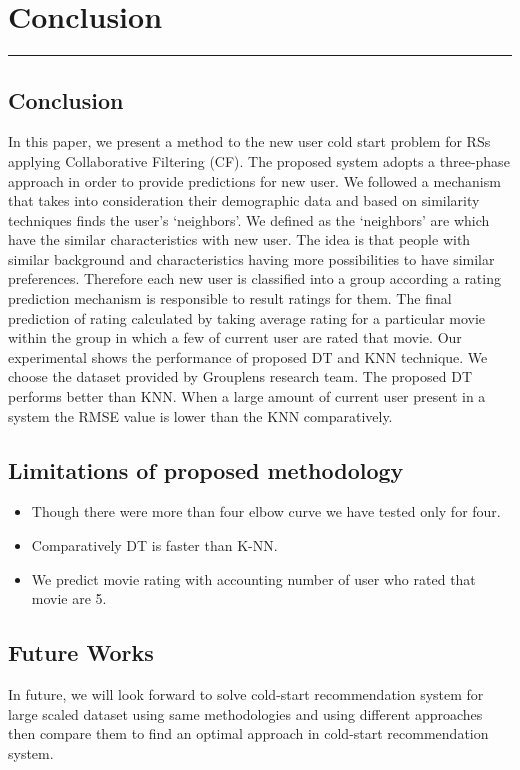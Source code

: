\documentclass[document.tex]{subfiles}
\begin{document}
\chapter{ Conclusion}
\hrule
\newpage
\section{Conclusion}
In this paper, we present a method to the new user cold start problem for RSs applying Collaborative Filtering (CF). The  proposed system adopts a three-phase approach in order to provide predictions for new user. We followed a mechanism that takes into consideration their demographic data and based on similarity techniques finds the user’s ‘neighbors’. We defined as the ‘neighbors’ are which have the similar characteristics with new user. The idea is that people with similar background and characteristics having more possibilities to have similar preferences. Therefore each new user is classified into a group according a rating prediction mechanism is responsible to result ratings for them. The final prediction of rating calculated by taking average rating for a particular movie within the group in which a few of current user are rated that movie. Our experimental shows the performance of proposed DT and KNN technique. We choose the dataset provided by Grouplens research team. The proposed DT performs better than KNN. When a large amount of current user present in a system the RMSE value is lower than the KNN comparatively. 

\section{Limitations of proposed methodology}
\begin{itemize}
	\item Though there were more than four elbow curve we have tested only for four.
	\item Comparatively DT is faster than K-NN.
	\item We predict movie rating with accounting number of user who rated that movie are 5.
\end{itemize}

\section{Future Works}
In future, we will look forward to solve cold-start recommendation system for large scaled dataset using same methodologies and using different approaches then compare them to find an optimal approach in cold-start recommendation system. 
\end{document}
